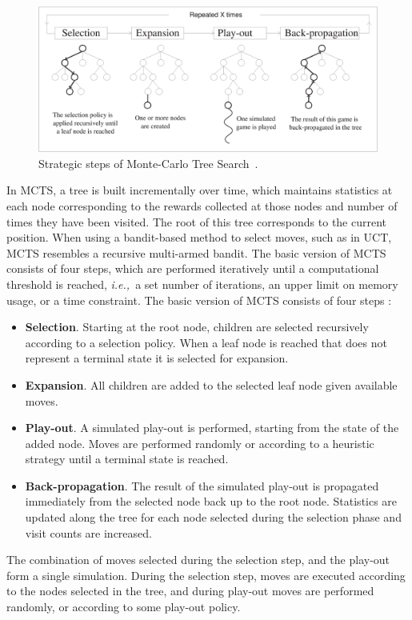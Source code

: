 \documentclass{kecsmstr}
\newcommand{\ie}{{\it i.e.,}~}
\begin{document}
\begin{figure}[ht]
	\centering
	\includegraphics[width=1.\textwidth]{img/figure1.eps}
	\caption{Strategic steps of Monte-Carlo Tree Search~\protect{}.}
	\label{fig:mcts-algorithm}
\end{figure}
\noindent In MCTS, a tree is built incrementally over time, which maintains statistics at each node corresponding to the rewards collected at those nodes and number of times  they have been visited. The root of this tree corresponds to the current position. When using a bandit-based method to select moves, such as in UCT, MCTS resembles a recursive multi-armed bandit. The basic version of MCTS consists of four steps, which are performed iteratively until a computational threshold is reached, \ie a set number of iterations, an upper limit on memory usage, or a time constraint. The basic version of MCTS consists of four steps :
\begin{itemize}
\item {\bf Selection}. Starting at the root node, children are selected recursively according to a selection policy. When a leaf node is reached that does not represent a terminal state it is selected for expansion.
\item {\bf Expansion}. All children are added to the selected leaf node given available moves.
\item {\bf Play-out}. A simulated play-out is performed, starting from the state of the added node. Moves are performed randomly or according to a heuristic strategy until a terminal state is reached.
\item {\bf Back-propagation}. The result of the simulated play-out is propagated immediately from the selected node back up to the root node. Statistics are updated along the tree for each node selected during the selection phase and visit counts are increased.
\end{itemize}
The combination of moves selected during the selection step, and the play-out form a single simulation. During the selection step, moves are executed according to the nodes selected in the tree, and during play-out moves are performed randomly, or according to some play-out policy.
\end{document}
